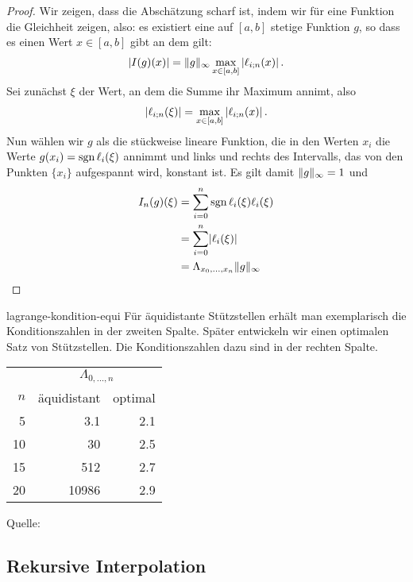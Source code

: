 \begin{proof}
  Wir zeigen, dass die Abschätzung scharf ist, indem wir für eine
  Funktion die Gleichheit zeigen, also: es existiert eine auf $[a,b]$
  stetige Funktion $g$, so dass es einen Wert $x\in [a,b]$ gibt an dem gilt:
  \begin{gather}
    \lvert I(g)(x)\rvert
    = \lVert g\rVert_\infty \max_{x\in [a,b]} \left\vert \ell_{i;n}(x)\right\vert.
  \end{gather}
  Sei zunächst $\xi$ der Wert, an dem die Summe ihr Maximum annimt, also
  \begin{gather}
    \left\vert \ell_{i;n}(\xi)\right\vert
    = \max_{x\in [a,b]} \left\vert \ell_{i;n}(x)\right\vert.
  \end{gather}
  Nun wählen wir $g$ als die stückweise lineare Funktion, die in den
  Werten $x_i$ die Werte
  $g(x_i) = \operatorname{sgn} \ell_i(\xi)$ annimmt und links und rechts des Intervalls, das von den Punkten $\{x_i\}$ aufgespannt wird, konstant ist. Es gilt damit $\lVert g\rVert_\infty = 1$ und
  \begin{align}
    I_n(g)(\xi)
    &= \sum_{i=0}^n  \operatorname{sgn} \ell_i(\xi) \ell_i(\xi) \\
    &= \sum_{i=0}^n  \lvert\ell_i(\xi)\rvert \\
    &= \Lambda_{x_0,\dots,x_n} \lVert g\rVert_\infty
  \end{align}
\end{proof}

\begin{Beispiel}{lagrange-kondition-equi}
  Für äquidistante Stützstellen erhält man exemplarisch die Konditionszahlen in der zweiten Spalte. Später entwickeln wir einen optimalen Satz von Stützstellen. Die Konditionszahlen dazu sind in der rechten Spalte.
  \begin{center}
    \begin{tabular}{r|rr}
      & \multicolumn{2}{c}{ $\Lambda_{0,\dots,n}$}\\
      $n$ & äquidistant & optimal\\\hline
      5 & 3.1 & 2.1\\
      10 & 30 & 2.5 \\
      15 & 512 & 2.7 \\
      20 & 10986 & 2.9
    \end{tabular}
  \end{center}
  Quelle: \cite{DeuflhardHohmann08}
\end{Beispiel}

\subsection{Rekursive Interpolation}

